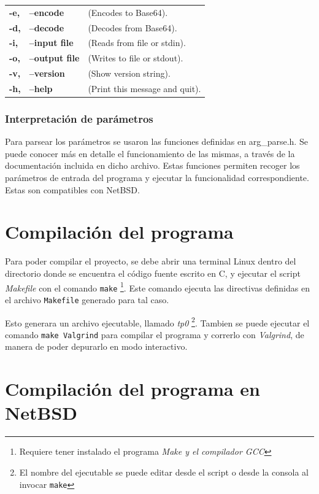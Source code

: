 \documentclass[a4paper,10pt,oneside]{article}
\begin{document}
\begin{ttfamily}
\begin{tabular}{lll}

\bf{-e,} & \bf{--encode} &(Encodes to Base64). \\
\bf{-d,} & \bf{--decode} &(Decodes from Base64).\\
\bf{-i,} & \bf{--input file} &(Reads from file or stdin).\\
\bf{-o,} & \bf{--output file} &(Writes to file or stdout).\\
\bf{-v,} & \bf{--version} 	&(Show version string).\\
\bf{-h,} & \bf{--help} &(Print this message and quit).\\
\end{tabular}
\end{ttfamily}

\subsubsection{Interpretación de parámetros}
Para parsear los parámetros se usaron las funciones definidas en arg\_parse.h. Se puede conocer más en detalle el funcionamiento de las mismas, a través de la documentación incluida en dicho archivo. 
		Estas funciones permiten recoger los parámetros de entrada del programa y ejecutar la funcionalidad correspondiente. Estas son compatibles con NetBSD.
			
	\section{Compilación del programa}
	
	Para poder compilar el proyecto, se debe abrir una terminal Linux dentro del directorio donde se encuentra el código 
	fuente escrito en C, y ejecutar el script \textit{Makefile} con el comando \texttt{make} \footnote{Requiere tener instalado el programa \it{Make} y el compilador \it{GCC}}. Este comando ejecuta las directivas definidas en el archivo \texttt{Makefile} generado para tal caso. 
		
	 Esto generara un archivo ejecutable, llamado \textit{tp0} \footnote{El nombre del ejecutable se puede editar desde el script o desde la consola al invocar \texttt{make}}.  Tambien se puede ejecutar el comando \texttt{make Valgrind} para compilar el programa y correrlo con \textit{Valgrind}, de manera de poder depurarlo en modo interactivo.
		 
	\section{Compilación del programa en NetBSD}
	
\end{document}
